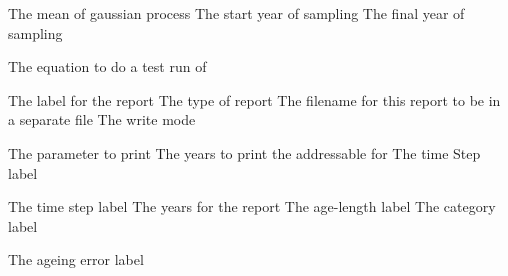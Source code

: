 \par\textbf{}\par
{} {The mean of gaussian process}
 {The start year of sampling}
 {The final year of sampling}
\par\textbf{}\par
{} {The equation to do a test run of}
\par\par
{} {The label for the report}
 {The type of report}
 {The filename for this report to be in a separate file}
 {The write mode}
\par\textbf{}\par
{} {The parameter to print}
 {The years to print the addressable for}
 {The time Step label}
\par\textbf{}\par
{} {The time step label}
 {The years for the report}
 {The age-length label}
 {The category label}
\par\textbf{}\par
{} {The ageing error label}
\par\textbf{}\par
\par\textbf{}\par
\par\textbf{}\par
\par\textbf{}\par
\par\textbf{}\par
\par\textbf{}\par
\par\textbf{}\par
